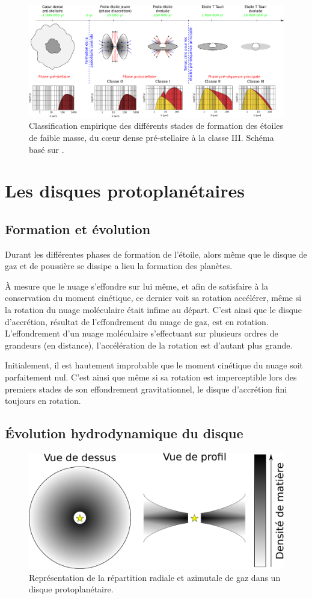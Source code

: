 \begin{figure}[htbp]
\centering
\includegraphics[width=\linewidth]{figure/star_formation.pdf}
\caption{Classification empirique des différents stades de formation des étoiles de faible masse, du cœur dense pré-stellaire à la classe III. Schéma basé sur \citep{andre2002initial}. }\label{fig:star_formation}
\end{figure}


\section{Les disques protoplanétaires}
\subsection{Formation et évolution}
Durant les différentes phases de formation de l'étoile, alors même que le disque de gaz et de poussière se dissipe a lieu la formation des planètes. 

À mesure que le nuage s'effondre sur lui même, et afin de satisfaire à la conservation du moment cinétique, ce dernier voit sa rotation accélérer, même si la rotation du nuage moléculaire était infime au départ. C'est ainsi que le disque d'accrétion, résultat de l'effondrement du nuage de gaz, est en rotation. L'effondrement d'un nuage moléculaire s'effectuant sur plusieurs ordres de grandeurs (en distance), l'accélération de la rotation est d'autant plus grande.

Initialement, il est hautement improbable que le moment cinétique du nuage soit parfaitement nul. C'est ainsi que même si sa rotation est imperceptible lors des premiers stades de son effondrement gravitationnel, le disque d'accrétion fini toujours en rotation. 

\subsection{Évolution hydrodynamique du disque}
\begin{figure}[htbp]
\centering
\includegraphics[width=0.6\linewidth]{figure/disk_scheme.pdf}
\caption{Représentation de la répartition radiale et azimutale de gaz dans un disque protoplanétaire.}\label{fig:disk_scheme}
\end{figure}

